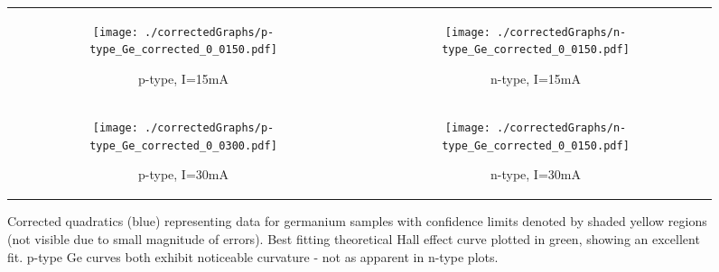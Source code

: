 \documentclass[a4paper]{article}
\begin{document}
			\begin{figure}[b!]
				\centering
				\begin{tabular}{c|c}
					\begin{subfigure}[t]{0.45\textwidth}
						\centering
						\texttt{[image: ./correctedGraphs/p-type\_Ge\_corrected\_0\_0150.pdf]}
						\caption{p-type, I=15mA}
						\label{fig:pTypeCorrected15}
					\end{subfigure}
					&
					\begin{subfigure}[t]{0.45\textwidth}
						\centering
						\texttt{[image: ./correctedGraphs/n-type\_Ge\_corrected\_0\_0150.pdf]}
						\caption{n-type, I=15mA}
						\label{fig:nTypeCorrected15}
					\end{subfigure}
					\\
					\begin{subfigure}[t]{0.45\textwidth}
						\centering
						\texttt{[image: ./correctedGraphs/p-type\_Ge\_corrected\_0\_0300.pdf]}
						\caption{p-type, I=30mA}
						\label{fig:pTypeCorrected30}
					\end{subfigure}
					&
					\begin{subfigure}[t]{0.45\textwidth}
						\centering
						\texttt{[image: ./correctedGraphs/n-type\_Ge\_corrected\_0\_0150.pdf]}
						\caption{n-type, I=30mA}
						\label{fig:nTypeCorrected30}
					\end{subfigure}
				\end{tabular}
				\caption{Corrected quadratics (blue) representing data for germanium samples with confidence limits denoted by shaded yellow regions (not visible due to small magnitude of errors). Best fitting theoretical Hall effect curve plotted in green, showing an excellent fit. p-type Ge curves both exhibit noticeable curvature - not as apparent in n-type plots.}
				\label{fig:semiconductorCorrected}
			\end{figure}
			
\end{document}
